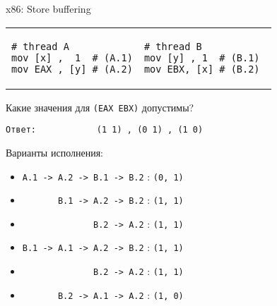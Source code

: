 \begin{frame}{x86: Store buffering}

\begin{tabular}{p{} p{}}
\begin{verbatim}
# thread A
mov [x] ,  1  # (A.1)
mov EAX , [y] # (A.2)
\end{verbatim}

& 

\begin{verbatim}
# thread B          
mov [y] , 1  # (B.1) 
mov EBX, [x] # (B.2) 
\end{verbatim}
\end{tabular}

Какие значения для \texttt{(EAX EBX)} допустимы?

\texttt{Ответ:\ \ \ \ \ \ \ \ \ \ \ \ (1 1)\ , (0 1)\ , (1 0)}

Варианты исполнения:
\begin{itemize}
    \item \texttt{A.1 -> A.2 -> B.1 -> B.2}                            : \texttt{(0, 1)}
    \item \texttt{\ \ \ \ \ \ \       B.1 -> A.2 -> B.2}               : \texttt{(1, 1)}
    \item \texttt{\ \ \ \ \ \ \ \ \ \ \ \ \ \              B.2 -> A.2} : \texttt{(1, 1)}
    \item \texttt{B.1 -> A.1 -> A.2 -> B.2}                            : \texttt{(1, 1)}
    \item \texttt{\ \ \ \ \ \ \ \ \ \ \ \ \ \              B.2 -> A.2} : \texttt{(1, 1)}
    \item \texttt{\ \ \ \ \ \ \       B.2 -> A.1 -> A.2}               : \texttt{(1, 0)}
\end{itemize}
\end{frame}

